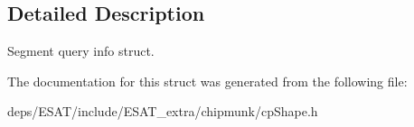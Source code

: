 \subsection{Detailed Description}
Segment query info struct. 

The documentation for this struct was generated from the following file\+:\begin{DoxyCompactItemize}
\item 
deps/\+E\+S\+A\+T/include/\+E\+S\+A\+T\+\_\+extra/chipmunk/cp\+Shape.\+h\end{DoxyCompactItemize}
